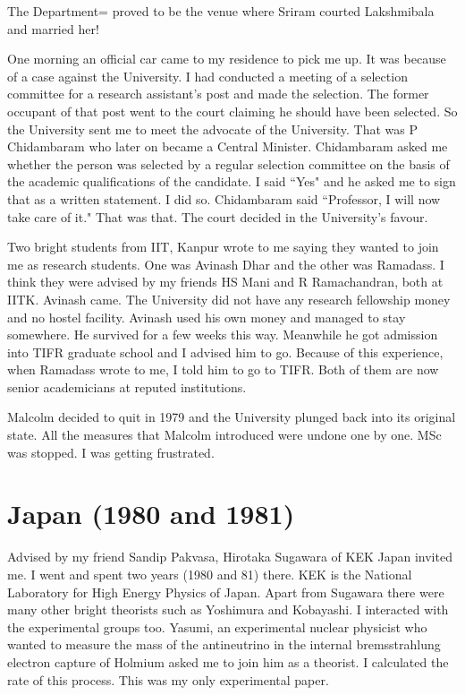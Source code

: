 The Department= proved to be the venue where Sriram courted Lakshmibala 
and married her!
 
One morning an official car came to my residence to pick me up. It was 
because of a case against the University. I had conducted a meeting of a 
selection committee for a research assistant's post and made the 
selection. The former occupant of that post went to the court claiming 
he should have been selected. So the University sent me to meet the 
advocate of the University. That was P Chidambaram who later on became a 
Central Minister. Chidambaram asked me whether the person was selected 
by a regular selection committee on the basis of the academic 
qualifications of the candidate. I said ``Yes" and he asked me to sign 
that as a written statement. I did so. Chidambaram said ``Professor, I 
will now take care of it." That was that. The court decided in the 
University's favour.

Two bright students from IIT, Kanpur wrote to me saying they wanted to 
join me as research students. One was Avinash Dhar and the other was 
Ramadass. I think they were advised by my friends HS Mani and R 
Ramachandran, both at IITK. Avinash came. The University did not have 
any research fellowship money and no hostel facility. Avinash used his 
own money and managed to stay somewhere. He survived for a few weeks 
this way. Meanwhile he got admission into TIFR graduate school and I 
advised him to go. Because of this experience, when Ramadass wrote to 
me, I told him to go to TIFR. Both of them are now senior academicians 
at reputed institutions.

Malcolm decided to quit in 1979 and the University plunged back into its 
original state. All the measures that Malcolm introduced were undone one 
by one. MSc was stopped. I was getting frustrated.

\section*{Japan (1980 and 1981)}

Advised by my friend Sandip Pakvasa, Hirotaka Sugawara of KEK Japan 
invited me. I went and spent two years (1980 and 81) there. KEK is the 
National Laboratory for High Energy Physics of Japan. Apart from 
Sugawara there were many other bright theorists such as Yoshimura and 
Kobayashi. I interacted with the experimental groups too. Yasumi, an 
experimental nuclear physicist who wanted to measure the mass of the 
antineutrino in the internal bremsstrahlung electron capture of Holmium 
asked me to join him as a theorist. I calculated the rate of this 
process. This was my only experimental paper.

